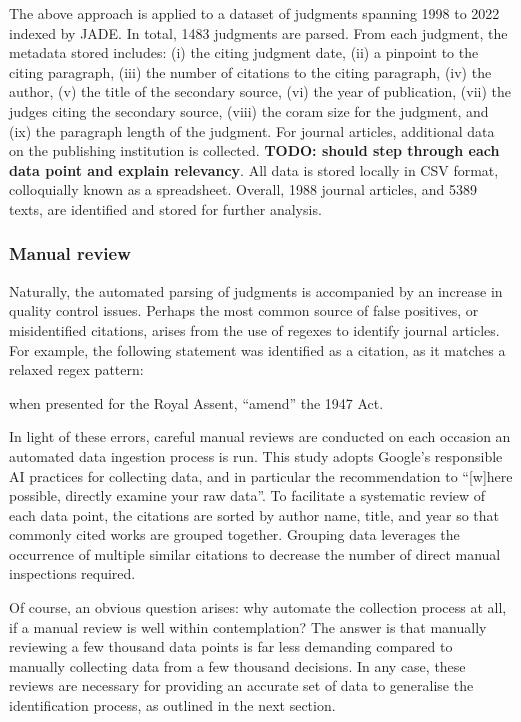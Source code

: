 The above approach is applied to a dataset of judgments spanning 1998 to 2022 indexed by JADE. In total, 1483 judgments are parsed. From each judgment, the metadata stored includes: (i) the citing judgment date, (ii) a pinpoint to the citing paragraph, (iii) the number of citations to the citing paragraph, (iv) the author, (v) the title of the secondary source, (vi) the year of publication, (vii) the judges citing the secondary source, (viii) the coram size for the judgment, and (ix) the paragraph length of the judgment. For journal articles, additional data on the publishing institution is collected. \textbf{TODO: should step through each data point and explain relevancy}. All data is stored locally in CSV format, colloquially known as a spreadsheet. Overall, 1988 journal articles, and 5389 texts, are identified and stored for further analysis.

\subsubsection{Manual review}

Naturally, the automated parsing of judgments is accompanied by an increase in quality control issues. Perhaps the most common source of false positives, or misidentified citations, arises from the use of regexes to identify journal articles. For example, the following statement was identified as a citation, as it matches a relaxed regex pattern:

\begin{center}
when presented for the Royal Assent, ``amend'' the 1947 Act.
\end{center}

In light of these errors, careful manual reviews are conducted on each occasion an automated data ingestion process is run. This study adopts Google's responsible AI practices for collecting data, and in particular the recommendation to ``[w]here possible, directly examine your raw data''. To facilitate a systematic review of each data point, the citations are sorted by author name, title, and year so that commonly cited works are grouped together. Grouping data leverages the occurrence of multiple similar citations to decrease the number of direct manual inspections required.

Of course, an obvious question arises: why automate the collection process at all, if a manual review is well within contemplation? The answer is that manually reviewing a few thousand data points is far less demanding compared to manually collecting data from a few thousand decisions. In any case, these reviews are necessary for providing an accurate set of data to generalise the identification process, as outlined in the next section.

